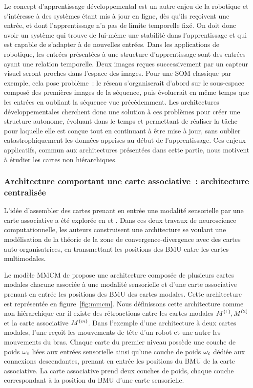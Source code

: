 \documentclass[../main]{subfiles}
\begin{document}
Le concept d'apprentissage  développemental est un autre enjeu de la robotique et s'intéresse à des systèmes étant mis à jour en ligne, dès qu'ils reçoivent une entrée, et dont l'apprentissage n'a pas de limite temporelle fixé. On doit donc avoir un système qui trouve de lui-même une stabilité dans l'apprentissage et qui est capable de s'adapter à de nouvelles entrées.
Dans les applications de robotique, les entrées présentées à une structure d'apprentissage sont des entrées ayant une relation temporelle. Deux images reçues successivement par un capteur visuel seront proches dans l'espace des images. Pour une SOM classique par exemple, cela pose problème~: le réseau s'organiserait d'abord sur le sous-espace composé des premières images de la séquence, puis évoluerait en même temps que les entrées en oubliant la séquence vue précédemment.
Les architectures développementales cherchent donc une solution à ces problèmes pour créer une structure autonome, évoluant dans le temps et permettant de réaliser la tâche pour laquelle elle est conçue tout en continuant à être mise à jour, sans oublier catastrophiquement les données apprises au début de l'apprentissage.
Ces enjeux applicatifs, commun aux architectures présentées dans cette partie, nous motivent à étudier les cartes non hiérarchiques.

\subsubsection{Architecture comportant une carte associative~: architecture centralisée}

L'idée d'assembler des cartes prenant en entrée une modalité sensorielle par une carte associative a été explorée en \cite{dominey13} et \cite{escobar-juarez_self-organized_2016}.
Dans ces deux travaux de neuroscience computationnelle, les auteurs construisent une architecture se voulant une modélisation de la théorie de la zone de convergence-divergence \cite{Edelman1982GroupSA} avec des cartes auto-organisatrices, en transmettant les positions des BMU entre les cartes multimodales. 

Le modèle MMCM de \cite{dominey13} propose une architecture composée de plusieurs cartes modales chacune associée à une modalité sensorielle et d'une carte associative prenant en entrée les positions des BMU des cartes modales. Cette architecture est représentée en figure~\ref{fig:mmcm}. 
Nous définissons cette architecture comme non hiérarchique car il existe des rétroactions entre les cartes modales $M^{({1})},M^{({2})}$ et la carte associative $M^{({m})}$.
Dans l'exemple d'une architecture à deux cartes modales, l'une reçoit les mouvements de tête d'un robot et une autre les mouvements du bras.
Chaque carte du premier niveau possède une couche de poids $\omega_e$ liées aux entrées sensorielle ainsi qu'une couche de poids $ \omega_c$ dédiée aux connexions descendantes, prenant en entrée les positions du BMU de la carte associative.
La carte associative prend deux couches de poids, chaque couche correspondant à la position du BMU d'une carte sensorielle.
\end{document}

